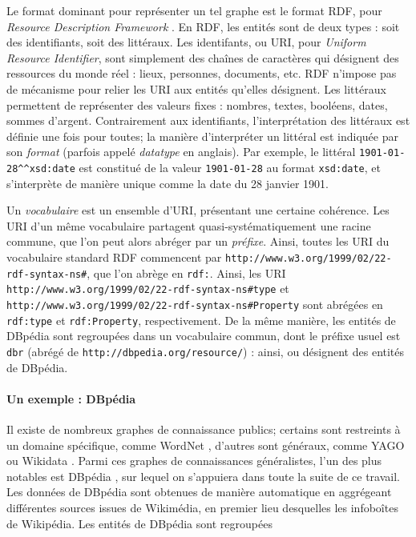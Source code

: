Le format dominant pour représenter un tel graphe est le format RDF, pour \textit{Resource Description Framework} \cite{cyganiak14}. En RDF, les entités sont de deux types : soit des identifiants, soit des littéraux. Les identifants, ou URI, pour \textit{Uniform Resource Identifier}, sont simplement des chaînes de caractères qui désignent des ressources du monde réel : lieux, personnes, documents, etc. %
RDF n'impose pas de mécanisme pour relier les URI aux entités qu'elles désignent. 
Les littéraux permettent de représenter des valeurs fixes : nombres, textes, booléens, dates, sommes d'argent. Contrairement aux identifiants, l'interprétation des littéraux est définie une fois pour toutes; la manière d'interpréter un littéral est indiquée par son \textit{format} (parfois appelé \textit{datatype} en anglais). Par exemple, le littéral \texttt{1901-01-28\^{}\^{}xsd:date} est constitué de la valeur \texttt{1901-01-28} au format \texttt{xsd:date}, et s'interprète de manière unique comme la date du 28 janvier 1901.

Un \textit{vocabulaire} est un ensemble d'URI, présentant une certaine cohérence. Les URI d'un même vocabulaire partagent quasi-systématiquement une racine commune, que l'on peut alors abréger par un \textit{préfixe}. Ainsi, toutes les URI du vocabulaire standard RDF commencent par \texttt{http://www.w3.org/1999/02/22-rdf-syntax-ns\#}, que l'on abrège en \texttt{rdf:}. Ainsi, les URI \texttt{http://www.w3.org/1999/02/22-rdf-syntax-ns\#type} et \texttt{http://www.w3.org/1999/02/22-rdf-syntax-ns\#Property} sont abrégées en \texttt{rdf:type} et \texttt{rdf:Property}, respectivement. 
De la même manière, les entités de DBpédia sont regroupées dans un vocabulaire commun, dont le préfixe usuel est \texttt{dbr} (abrégé de \texttt{http://dbpedia.org/resource/}) : ainsi,  ou  désignent des entités de DBpédia.


\paragraph{Un exemple : DBpédia}

Il existe de nombreux graphes de connaissance publics; certains sont restreints à un domaine spécifique, comme WordNet \cite{miller1998wordnet}, d'autres sont généraux, comme YAGO \cite{suchanek2008yago} ou Wikidata \cite{vrandevcic2014wikidata}. Parmi ces graphes de connaissances généralistes, l'un des plus notables est DBpédia \cite{auer2007dbpedia}, sur lequel on s'appuiera dans toute la suite de ce travail. Les données de DBpédia sont obtenues de manière automatique en aggrégeant différentes sources issues de Wikimédia, en premier lieu desquelles les infoboîtes de Wikipédia. Les entités de DBpédia sont regroupées 

